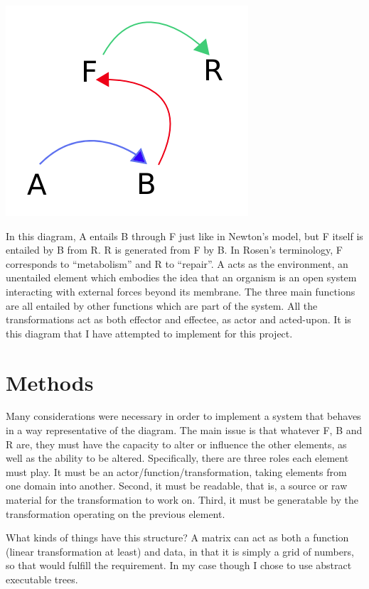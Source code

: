 \documentclass[12pt]{article}
\begin{document}
\begin{center}
\includegraphics[scale=0.6]{rosen.png}
\end{center}

In this diagram, A entails B through F just like in Newton's model, but F itself is entailed by B from R.  R is generated from F by B.  In Rosen's terminology, F corresponds to ``metabolism'' and R to ``repair''.  A acts as the environment, an unentailed element which embodies the idea that an organism is an open system interacting with external forces beyond its membrane.  The three main functions are all entailed by other functions which are part of the system.  All the transformations act as both effector and effectee, as actor and acted-upon.  It is this diagram that I have attempted to implement for this project.

\section{Methods}

Many considerations were necessary in order to implement a system that behaves in a way representative of the diagram.  The main issue is that whatever F, B and R are, they must have the capacity to alter or influence the other elements, as well as the ability to be altered.  Specifically, there are three roles each element must play.  It must be an actor/function/transformation, taking elements from one domain into another.  Second, it must be readable, that is, a source or raw material for the transformation to work on.  Third, it must be generatable by the transformation operating on the previous element.  

What kinds of things have this structure?  A matrix can act as both a function (linear transformation at least) and data, in that it is simply a grid of numbers, so that would fulfill the requirement.  In my case though I chose to use abstract executable trees.  
\end{document}
